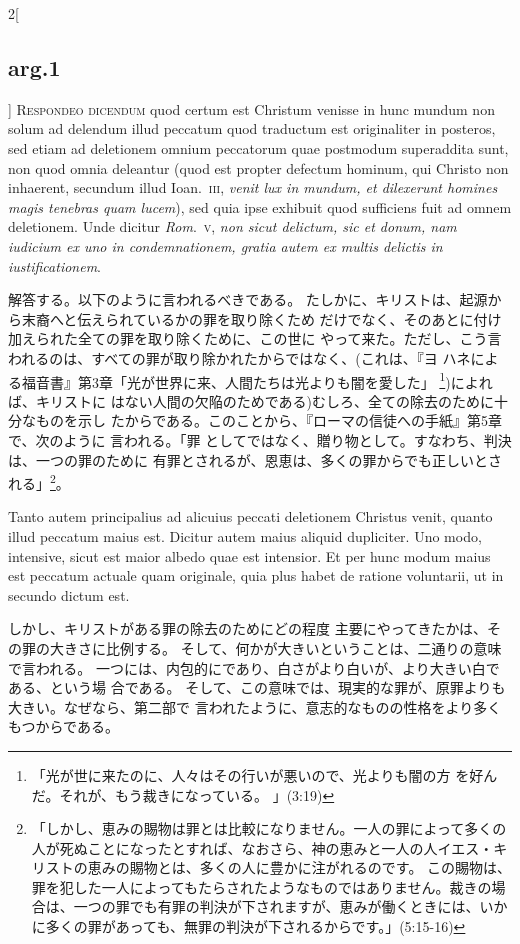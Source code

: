 \documentclass[paper=a4paper,fontsize=10pt,jafontsize=9pt,titlepage]{jlreq}
\begin{document}
\begin{paracol}{2}[\subsection{arg.1}]
{\scshape Respondeo dicendum} quod certum est Christum
venisse in hunc mundum non solum ad delendum illud peccatum quod
traductum est originaliter in posteros, sed etiam ad deletionem omnium
peccatorum quae postmodum superaddita sunt, non quod omnia deleantur
(quod est propter defectum hominum, qui Christo non inhaerent, secundum
illud Ioan.~{\scshape iii}, {\itshape venit lux in mundum, et dilexerunt homines magis
tenebras quam lucem}), sed quia ipse exhibuit quod sufficiens fuit ad
omnem deletionem. 
Unde dicitur {\itshape Rom}.~{\scshape v}, {\itshape non sicut delictum, sic et donum,
nam iudicium ex uno in condemnationem, gratia autem ex multis delictis
in iustificationem}.

\switchcolumn

解答する。以下のように言われるべきである。
たしかに、キリストは、起源から末裔へと伝えられているかの罪を取り除くため
 だけでなく、そのあとに付け加えられた全ての罪を取り除くために、この世に
 やって来た。ただし、こう言われるのは、すべての罪が取り除かれたからではなく、(これは、『ヨ
 ハネによる福音書』第3章「光が世界に来、人間たちは光よりも闇を愛した」
 \footnote{「光が世に来たのに、人々はその行いが悪いので、光よりも闇の方
 を好んだ。それが、もう裁きになっている。 」(3:19)})によれば、キリストに
 はない人間の欠陥のためである)むしろ、全ての除去のために十分なものを示し
 たからである。このことから、『ローマの信徒への手紙』第5章で、次のように
 言われる。「罪
としてではなく、贈り物として。すなわち、判決は、一つの罪のために
 有罪とされるが、恩恵は、多くの罪からでも正しいとされる」\footnote{「しかし、恵みの賜物は罪とは比較になりません。一人の罪によって多くの人が死ぬことになったとすれば、なおさら、神の恵みと一人の人イエス・キリストの恵みの賜物とは、多くの人に豊かに注がれるのです。 この賜物は、罪を犯した一人によってもたらされたようなものではありません。裁きの場合は、一つの罪でも有罪の判決が下されますが、恵みが働くときには、いかに多くの罪があっても、無罪の判決が下されるからです。」(5:15-16)}。

\switchcolumn*

Tanto autem principalius ad alicuius peccati
deletionem Christus venit, quanto illud peccatum maius est. 
Dicitur
autem maius aliquid dupliciter. Uno modo, intensive, sicut est maior
albedo quae est intensior. Et per hunc modum maius est peccatum actuale
quam originale, quia plus habet de ratione voluntarii, ut in secundo
dictum est.

\switchcolumn

しかし、キリストがある罪の除去のためにどの程度
 主要にやってきたかは、その罪の大きさに比例する。
そして、何かが大きいということは、二通りの意味で言われる。
一つには、内包的にであり、白さがより白いが、より大きい白である、という場
 合である。
そして、この意味では、現実的な罪が、原罪よりも大きい。なぜなら、第二部で
 言われたように、意志的なものの性格をより多くもつからである。


\end{paracol}
\end{document}
